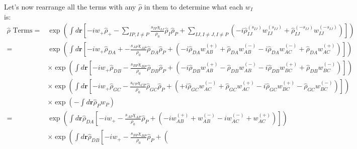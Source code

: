 \documentclass{article}
\begin{document}
Let's now rearrange all the terms with any $\hat{\rho}$ in them to determine
  what each $w_I$ is:
\begin{align*}
  \hat{\rho}\textrm{ Terms} =
    &\exp \left(
      \int d \mathbf{r} \left[
        - i w_+ \hat{\rho}_+
        -
        \sum_{IP,I \ne P}
        \frac{s_{IP}\chi_{IJ}}{\rho_0}
        \hat{\rho}_I \hat{\rho}_P
        +
        \sum_{IJ, I \ne J, I \ne P}
        \left(
          -i \hat{\rho}_{IJ}^{(s_{IJ})} w_{IJ}^{(s_{IJ})}
          + \hat{\rho}_{IJ}^{(-s_{IJ})} w_{IJ}^{(-s_{IJ})}
        \right)
      \right]
    \right) \\
  =
    &\exp \left(
      \int d \mathbf{r} \left[
        - i w_+ \hat{\rho}_{DA}
        +
        - \frac{s_{AP}\chi_{AP}}{\rho_0}
        \hat{\rho}_{DA} \hat{\rho}_P
        +
        \left(
          -i \hat{\rho}_{DA} w_{AB}^{(+)} + \hat{\rho}_{DA} w_{AB}^{(-)}
          -i \hat{\rho}_{DA} w_{AC}^{(-)} + \hat{\rho}_{DA} w_{AC}^{(+)}
        \right)
      \right]
    \right) \\
    &\times
    \exp \left(
      \int d \mathbf{r} \left[
        - i w_+ \hat{\rho}_{DB}
        -
        \frac{s_{BP}\chi_{BP}}{\rho_0}
        \hat{\rho}_{DB} \hat{\rho}_P
        +
        \left(
          -i \hat{\rho}_{DB} w_{AB}^{(+)} - \hat{\rho}_{DB} w_{AB}^{(-)}
          -i \hat{\rho}_{DB} w_{BC}^{(+)} + \hat{\rho}_{DB} w_{BC}^{(-)}
        \right)
      \right]
    \right) \\
    &\times
    \exp \left(
      \int d \mathbf{r} \left[
        - i w_+ \hat{\rho}_{GC}
        -
        \frac{s_{CP}\chi_{CP}}{\rho_0}
        \hat{\rho}_{GC} \hat{\rho}_P
        +
        \left(
          +i \hat{\rho}_{GC} w_{AC}^{(-)} + \hat{\rho}_{GC} w_{AC}^{(+)}
          -i \hat{\rho}_{GC} w_{BC}^{(+)} - \hat{\rho}_{GC} w_{BC}^{(-)}
        \right)
      \right]
    \right) \\
            &\times
      \exp\left(
        - \int d \mathbf{r} \hat{\rho}_{P} w_P %
      \right)
\\
  =
    &\exp \left(
      \int d \mathbf{r} \hat{\rho}_{DA} \left[
        - i w_+ 
        -
        \frac{s_{AP}\chi_{AP}}{\rho_0}
        \hat{\rho}_P
        +
        \left(
          -i w_{AB}^{(+)} + w_{AB}^{(-)}
          -i w_{AC}^{(-)} + w_{AC}^{(+)}
        \right)
      \right]
    \right) \\
    &\times
    \exp \left(
      \int d \mathbf{r} \hat{\rho}_{DB} \left[
        - i w_+
        -
        \frac{s_{BP}\chi_{BP}}{\rho_0}
        \hat{\rho}_P
        +
        \left(

\end{align*}
\end{document}
